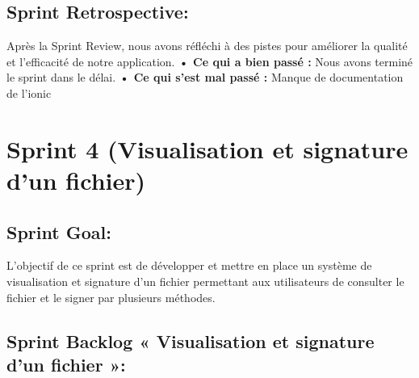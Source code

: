 \subsection{Sprint Retrospective:}

Après la Sprint Review, nous avons réfléchi à des pistes pour améliorer la qualité et l'efficacité de notre application.
\noindent\textbf{•	Ce qui a bien passé :}
Nous avons terminé le sprint dans le délai.
\noindent\textbf{•	Ce qui s'est mal passé :}
Manque de documentation de l'ionic 


\section{Sprint 4 (Visualisation et signature d'un fichier)}
\subsection{Sprint Goal:}
L'objectif de ce sprint est de développer et mettre en place un système de visualisation et signature d'un fichier permettant aux utilisateurs de consulter le fichier et le signer par plusieurs méthodes.


\subsection{Sprint Backlog « Visualisation et signature d'un fichier »:}

